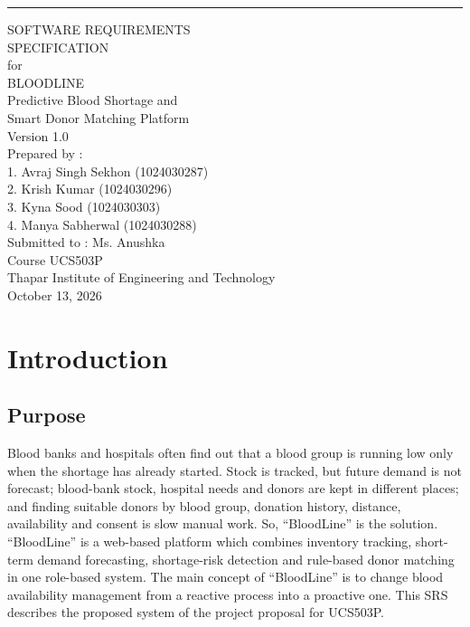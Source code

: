 \documentclass{scrreprt}
\date{}
\def\myversion{1.0 }
\begin{document}
\begin{flushright}
    \rule{\textwidth}{5pt}\vskip1cm
    \begin{bfseries}
        \Huge{SOFTWARE REQUIREMENTS\\ SPECIFICATION}\\
        \vspace{1.2cm}
        for\\
        \vspace{1.2cm}
        BLOODLINE\\
        \Large{Predictive Blood Shortage and\\ Smart Donor Matching Platform}\\
        \vspace{1.2cm}
        \LARGE{Version \myversion}\\
        \vspace{1.2cm}
        \large
        Prepared by :\\
        1. Avraj Singh Sekhon (1024030287)\\
        2. Krish Kumar (1024030296)\\
        3. Kyna Sood (1024030303)\\
        4. Manya Sabherwal (1024030288)\\
        \vspace{1.2cm}
        Submitted to : Ms. Anushka\\
        Course UCS503P\\
        Thapar Institute of Engineering and Technology\\
        \vspace{1.2cm}
        October 13, 2026\\
    \end{bfseries}
\end{flushright}


\tableofcontents

\chapter{Introduction}

\section{Purpose}
Blood banks and hospitals often find out that a blood group is running low only when the shortage has already started. Stock is tracked, but future demand is not forecast; blood-bank stock, hospital needs and donors are kept in different places; and finding suitable donors by blood group, donation history, distance, availability and consent is slow manual work. So, ``BloodLine'' is the solution.
\newline
``BloodLine'' is a web-based platform which combines inventory tracking, short-term demand forecasting, shortage-risk detection and rule-based donor matching in one role-based system. The main concept of ``BloodLine'' is to change blood availability management from a reactive process into a proactive one. This SRS describes the proposed system of the project proposal for UCS503P.
\end{document}

